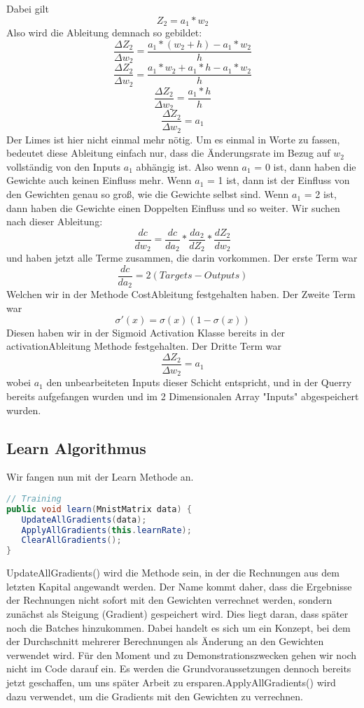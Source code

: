 \documentclass[12pt]{article}
\begin{document}
Dabei gilt 
$$Z_2 = a_1*w_2$$
Also wird die Ableitung demnach so gebildet:
$$\frac{\Delta Z_2}{\Delta w_2}=\frac{a_1*(w_2+h)-a_1*w_2}{h}$$
$$\frac{\Delta Z_2}{\Delta w_2}=\frac{a_1*w_2+a_1*h-a_1*w_2}{h}$$
$$\frac{\Delta Z_2}{\Delta w_2}=\frac{a_1*h}{h}$$
$$\frac{\Delta Z_2}{\Delta w_2}=a_1$$
Der Limes ist hier nicht einmal mehr nötig. Um es einmal in Worte zu fassen, bedeutet diese Ableitung einfach nur, dass die Änderungsrate im Bezug auf $w_2$ vollständig von den Inputs $a_1$ abhängig ist. Also wenn $a_1$ = 0 ist, dann haben die Gewichte auch keinen Einfluss mehr. Wenn $a_1$ = 1 ist, dann ist der Einfluss von den Gewichten genau so groß, wie die Gewichte selbst sind. Wenn $a_1$ = 2 ist, dann haben die Gewichte einen Doppelten Einfluss und so weiter. Wir suchen nach dieser Ableitung:
$$\frac{ dc }{ dw_{ 2 } }=
\frac{ dc }{ da_{ 2 } }*
\frac{ da_{ 2 } }{ dZ_{ 2 } }*
\frac{ dZ_{ 2 } }{ dw_{ 2 } }$$
und haben jetzt alle Terme zusammen, die darin vorkommen. Der erste Term war 
$$\frac{dc}{da_2}=2(Targets-Outputs)$$
Welchen wir in der Methode CostAbleitung festgehalten haben.
Der Zweite Term war
$$\sigma '(x)=\sigma (x)(1-\sigma(x))$$
Diesen haben wir in der Sigmoid Activation Klasse bereits in der activationAbleitung Methode festgehalten.
Der Dritte Term war
$$\frac{\Delta Z_2}{\Delta w_2}=a_1$$
wobei $a_1$ den unbearbeiteten Inputs dieser Schicht entspricht, und in der Querry bereits aufgefangen wurden und im 2 Dimensionalen Array "Inputs" abgespeichert wurden.\subsection{ Learn Algorithmus}Wir fangen nun mit der Learn Methode an.\begin{lstlisting}[language=Java]
// Training
public void learn(MnistMatrix data) {
   UpdateAllGradients(data);
   ApplyAllGradients(this.learnRate);
   ClearAllGradients();
}
\end{lstlisting}UpdateAllGradients() wird die Methode sein, in der die Rechnungen aus dem letzten Kapital angewandt werden. Der Name kommt daher, dass die Ergebnisse der Rechnungen nicht sofort mit den Gewichten verrechnet werden, sondern zunächst als Steigung (Gradient) gespeichert wird. Dies liegt daran, dass später noch die Batches hinzukommen. Dabei handelt es sich um ein Konzept, bei dem der Durchschnitt mehrerer Berechnungen  als Änderung an den Gewichten verwendet wird. Für den Moment und zu Demonstrationszwecken gehen wir noch nicht im Code darauf ein. Es werden die Grundvoraussetzungen dennoch bereits jetzt geschaffen, um uns später Arbeit zu ersparen.ApplyAllGradients() wird dazu verwendet, um die Gradients mit den Gewichten zu verrechnen. 
\end{document}
